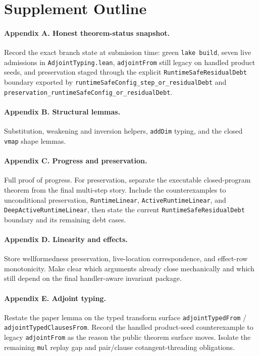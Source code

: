 
\section*{Supplement Outline}

\paragraph{Appendix A. Honest theorem-status snapshot.}
Record the exact branch state at submission time: green \texttt{lake build}, seven live admissions in \texttt{AdjointTyping.lean}, \texttt{adjointFrom} still legacy on handled product seeds, and preservation staged through the explicit \texttt{RuntimeSafeResidualDebt} boundary exported by \texttt{runtimeSafeConfig\_step\_or\_residualDebt} and \texttt{preservation\_runtimeSafeConfig\_or\_residualDebt}.

\paragraph{Appendix B. Structural lemmas.}
Substitution, weakening and inversion helpers, \texttt{addDim} typing, and the closed \texttt{vmap} shape lemmas.

\paragraph{Appendix C. Progress and preservation.}
Full proof of progress. For preservation, separate the executable closed-program theorem from the final multi-step story. Include the counterexamples to unconditional preservation, \texttt{RuntimeLinear}, \texttt{ActiveRuntimeLinear}, and \texttt{DeepActiveRuntimeLinear}, then state the current \texttt{RuntimeSafeResidualDebt} boundary and its remaining debt cases.

\paragraph{Appendix D. Linearity and effects.}
Store wellformedness preservation, live-location correspondence, and effect-row monotonicity. Make clear which arguments already close mechanically and which still depend on the final handler-aware invariant package.

\paragraph{Appendix E. Adjoint typing.}
Restate the paper lemma on the typed transform surface \texttt{adjointTypedFrom} / \texttt{adjointTypedClausesFrom}. Record the handled product-seed counterexample to legacy \texttt{adjointFrom} as the reason the public theorem surface moves. Isolate the remaining \texttt{mul} replay gap and pair/clause cotangent-threading obligations.

